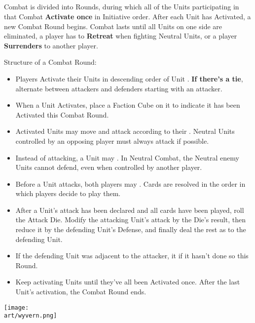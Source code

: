 \begin{multicols*}{2}
\subsection*{}
Combat is divided into Rounds, during which all of the Units participating in that Combat \textbf{Activate once} in Initiative order.
After each Unit has Activated, a new Combat Round begins.
Combat lasts until all Units on one side are eliminated, a player has to \textbf{Retreat} when fighting Neutral Units, or a player \textbf{Surrenders} to another player.

Structure of a Combat Round:
\begin{itemize}
  \item Players Activate their Units in descending order of Unit . \textbf{If there's a tie}, alternate between attackers and defenders starting with an attacker.
  \item When a Unit Activates, place a Faction Cube on it to indicate it has been Activated this Combat Round.
  \item Activated Units may move and attack according to their . Neutral Units controlled by an opposing player must always attack if possible.
  \item Instead of attacking, a Unit may .
  In Neutral Combat, the Neutral enemy Units cannot defend, even when controlled by another player.
  \item Before a Unit attacks, both players may . Cards are resolved in the order in which players decide to play them.
  \item After a Unit's attack has been declared and all cards have been played, roll the Attack Die.
    Modify the attacking Unit's attack by the Die's result, then reduce it by the defending Unit's Defense, and finally deal the rest as  to the defending Unit.
  \item If the defending Unit was adjacent to the attacker, it  if it hasn't done so this Round.
  \item Keep activating Units until they've all been Activated once.
After the last Unit's activation, the Combat Round ends.
\end{itemize}

\begin{center}
  \texttt{[image: \\art/wyvern.png]}
\end{center}


\end{multicols*}
